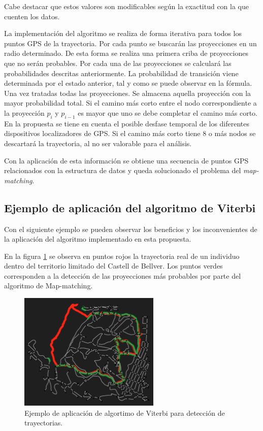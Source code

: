Cabe destacar que estos valores son modificables según la exactitud con la que cuenten los datos.

La implementación del algoritmo se realiza de forma iterativa para todos los puntos \ac{GPS} de la trayectoria.
Por cada punto se buscarán las proyecciones en un radio determinado. De esta forma se realiza una primera 
criba de proyecciones que no serán probables.
Por cada una de las proyecciones se calculará las probabilidades descritas anteriormente. La probabilidad de 
transición viene determinada por el estado anterior, tal y como se puede observar en la fórmula.
Una vez tratadas todas las proyecciones. Se almacena aquella proyección con la mayor probabilidad total. Si el 
camino más corto entre el nodo correspondiente a la proyección $p_{i}$ y $p_{i-1}$ es mayor que uno se debe 
completar el camino más corto. En la propuesta se tiene en cuenta el posible desfase temporal de los diferentes 
dispositivos localizadores de \ac{GPS}. Si el camino más corto tiene 8 o más nodos se descartará la trayectoria, 
al no ser valorable para el análisis.

Con la aplicación de esta información se obtiene una secuencia de puntos \ac{GPS} relacionados con la estructura de 
datos y queda solucionado el problema del \textit{map-matching}.

\subsection{Ejemplo de aplicación del algoritmo de Viterbi}
Con el siguiente ejemplo se pueden observar los beneficios y los inconvenientes de la aplicación del algoritmo 
implementado en esta propuesta.

En la figura \ref{figure:MapMatching1} se observa en puntos rojos la trayectoria real de un individuo dentro del 
territorio limitado del Castell de Bellver. Los puntos verdes corresponden a la detección de las proyecciones 
más probables por parte del algoritmo de Map-matching.

\begin{figure}[htb]
\begin{center}
\includegraphics[width=0.6\textwidth]{./Imagenes/MapMatching1.png}
\caption{Ejemplo de aplicación de algortimo de Viterbi para detección de trayectorias.}
\label{figure:MapMatching1}
\end{center}
\end{figure}

